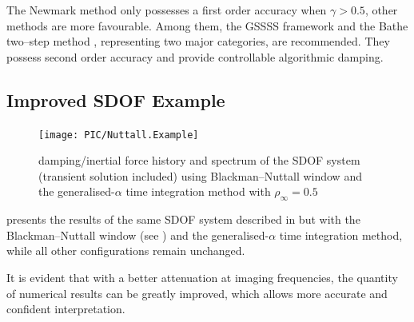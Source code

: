 The Newmark method only possesses a first order accuracy when $\gamma>0.5$, other methods are more favourable. Among them, the GSSSS framework \citep{Zhou2003,Zhou2006} and the Bathe two--step method \citep{Noh2019}, representing two major categories, are recommended. They possess second order accuracy and provide controllable algorithmic damping.
\subsection{Improved SDOF Example}
\begin{figure}[htb!]
\centering
\texttt{[image: PIC/Nuttall.Example]}
\caption{damping/inertial force history and spectrum of the SDOF system (transient solution included) using Blackman--Nuttall window and the generalised-$\alpha$ time integration method with $\rho_\infty=0.5$}\label{fig:nuttall_example}
\end{figure}
 presents the results of the same SDOF system described in  but with the Blackman--Nuttall window (see ) and the generalised-$\alpha$ time integration method, while all other configurations remain unchanged.

It is evident that with a better attenuation at imaging frequencies, the quantity of numerical results can be greatly improved, which allows more accurate and confident interpretation.
